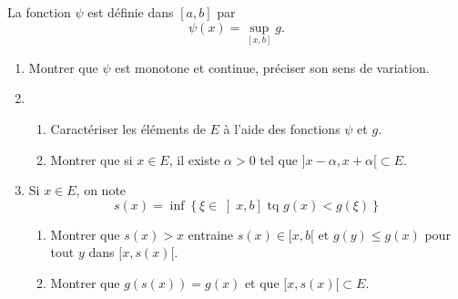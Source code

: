 La fonction $\psi $ est d{\'e}finie dans $\left[ a,b \right]$ par
\[
\psi (x)=\sup_{[x,b]}g.
\]

\begin{enumerate}
\item  Montrer que $\psi $ est monotone et continue, pr{\'e}ciser son sens de variation.

\item
\begin{enumerate}
\item  Caract{\'e}riser les {\'e}l{\'e}ments de $E$ {\`a} l'aide des fonctions $\psi $ et $g$.
\item  Montrer que si $x\in E$, il existe $\alpha >0$ tel que $]x-\alpha ,x+\alpha[ \subset E$.
\end{enumerate}

\item Si $x\in E$, on note
\[
s(x)=\inf \left\{ \xi \in \left] x,b \right] \text{ tq } g(x) < g(\xi ) \right\}
\]

\begin{enumerate}
\item Montrer que $s(x)>x$ entraine $s(x)\in [x,b[$ et $g(y)\leq g(x)$ pour tout $y$ dans $[x,s(x)[$.

\item Montrer que $g(s(x))=g(x)$ et que $[x,s(x)[ \subset E$.
\end{enumerate}
\end{enumerate}

